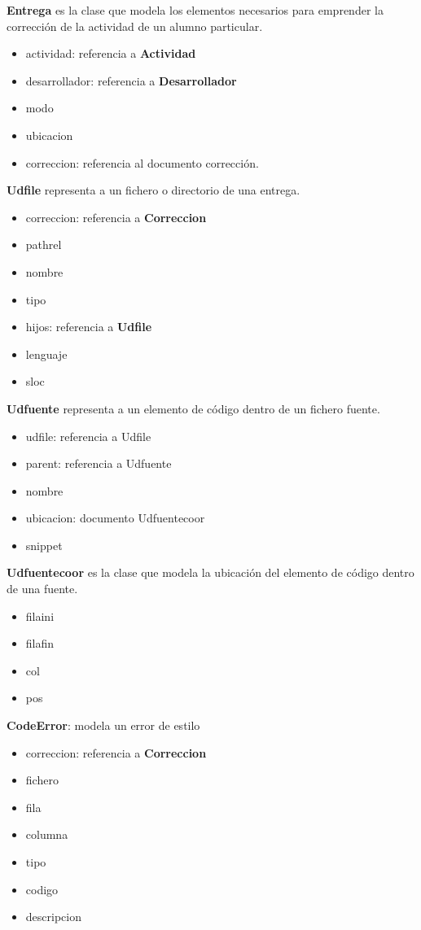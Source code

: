 \textbf{Entrega} es la clase que modela los elementos necesarios para emprender la corrección de la actividad de un alumno particular.
\begin{itemize}
\item actividad: referencia a \textbf{Actividad}
\item desarrollador: referencia a \textbf{Desarrollador}
\item modo
\item ubicacion
\item correccion: referencia al documento corrección.
\end{itemize}


\textbf{Udfile} representa a un fichero o directorio de una entrega.
\begin{itemize}
\item correccion: referencia a \textbf{Correccion}
\item pathrel
\item nombre
\item tipo
\item hijos: referencia a \textbf{Udfile}
\item lenguaje
\item sloc
\end{itemize}


\textbf{Udfuente} representa a un elemento de código dentro de un fichero fuente.
\begin{itemize}
\item udfile: referencia a Udfile
\item parent: referencia a Udfuente
\item nombre
\item ubicacion: documento Udfuentecoor
\item snippet
\end{itemize}


\textbf{Udfuentecoor} es la clase que modela la ubicación del elemento de código dentro de una fuente.
\begin{itemize}
\item filaini
\item filafin
\item col
\item pos
\end{itemize}


\textbf{CodeError}: modela un error de estilo
\begin{itemize}
\item correccion: referencia a \textbf{Correccion}
\item fichero
\item fila
\item columna
\item tipo
\item codigo
\item descripcion
\end{itemize}

